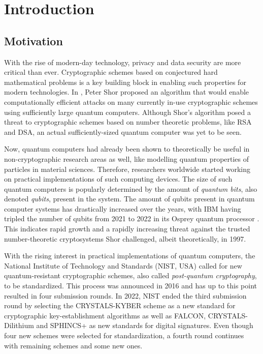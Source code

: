 \section{Introduction} \label{sec:intro}
\subsection{Motivation}
With the rise of modern-day technology, privacy and data security are more critical than ever. Cryptographic schemes based on conjectured hard mathematical problems is a key building block in enabling such properties for modern technologies. In \cite{Shor_1997}, Peter Shor proposed an algorithm that would enable computationally efficient attacks on many currently in-use cryptographic schemes using sufficiently large quantum computers. Although Shor's algorithm posed a threat to cryptographic schemes based on number theoretic problems, like RSA and DSA, an actual sufficiently-sized quantum computer was yet to be seen. 

Now, quantum computers had already been shown to theoretically be useful in non-cryptographic research areas as well, like modelling quantum properties of particles in material sciences. Therefore, researchers worldwide started working on practical implementations of such computing devices. The size of such quantum computers is popularly determined by the amount of \textit{quantum bits}, also denoted \textit{qubits}, present in the system. The amount of qubits present in quantum computer systems has drastically increased over the years, with IBM having tripled the number of qubits from 2021 to 2022 in its Osprey quantum processor \cite{IBM_Osprey}. This indicates rapid growth and a rapidly increasing threat against the trusted number-theoretic cryptosystems Shor challenged, albeit theoretically, in 1997.

With the rising interest in practical implementations of quantum computers, the National Institute of Technology and Standards (NIST, USA) called for new quantum-resistant cryptographic schemes, also called \textit{post-quantum cryptography}, to be standardized. This process was announced in 2016 and has up to this point resulted in four submission rounds. In 2022, NIST ended the third submission round by selecting the CRYSTALS-KYBER scheme as a new standard for cryptographic key-establishment algorithms as well as FALCON, CRYSTALS-Dilithium and SPHINCS+ as new standards for digital signatures. Even though four new schemes were selected for standardization, a fourth round continues with remaining schemes and some new ones. 

